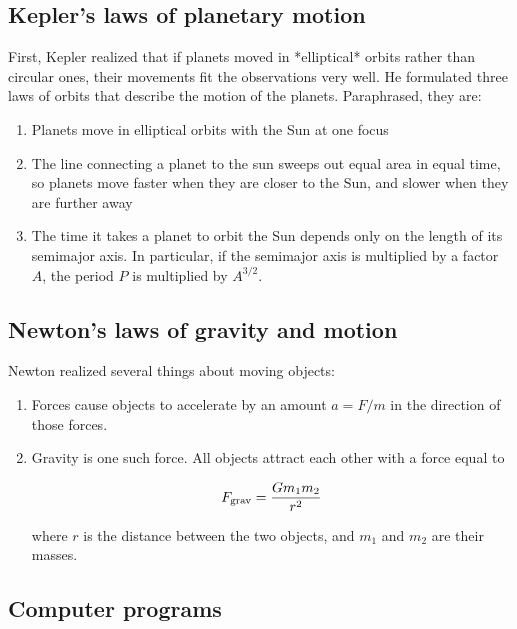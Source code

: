 \documentclass[11pt]{article}
\begin{document}
\subsection{Kepler's laws of planetary motion}

First, Kepler realized that if planets moved in *elliptical* orbits rather than circular ones, their movements fit the observations very well. He formulated three laws of orbits that describe the motion of the planets. Paraphrased, they are:

\begin{enumerate}

\item Planets move in elliptical orbits with the Sun at one focus
  
\item The line connecting a planet to the sun sweeps out equal area in equal time, so planets move faster when they are closer to the Sun, and slower when they are further away

\item  The time it takes a planet to orbit the Sun depends only on the length of its semimajor axis. In particular, if the semimajor axis is multiplied by a factor $A$, the period $P$ is multiplied by $A^{3/2}.$

\end{enumerate}


\subsection{Newton's laws of gravity and motion}

Newton realized several things about moving objects:

\begin{enumerate}
	\item Forces cause objects to accelerate by an amount $a = F/m$ in the direction of those forces.
	\item Gravity is one such force. All objects attract each other with a force equal to
	
	$$ F_{\rm grav} = \frac{Gm_1m_2}{r^2} $$
	
	where $r$ is the distance between the two objects, and $m_1$ and $m_2$ are their masses.
\end{enumerate}

\subsection{Computer programs}
\end{document}
